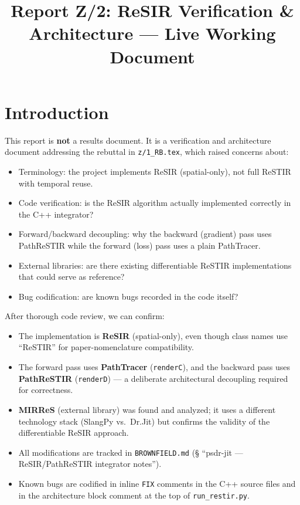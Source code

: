 
\title{Report Z/2: ReSIR Verification \& Architecture --- Live Working Document}

\maketitle

\section{Introduction}

This report is \textbf{not} a results document. It is a verification and
architecture document addressing the rebuttal in \texttt{z/1\_RB.tex}, which
raised concerns about:

\begin{itemize}
    \item Terminology: the project implements ReSIR (spatial-only), not full
        ReSTIR with temporal reuse.
    \item Code verification: is the ReSIR algorithm actually implemented
        correctly in the C++ integrator?
    \item Forward/backward decoupling: why the backward (gradient) pass uses
        PathReSTIR while the forward (loss) pass uses a plain PathTracer.
    \item External libraries: are there existing differentiable ReSTIR
        implementations that could serve as reference?
    \item Bug codification: are known bugs recorded in the code itself?
\end{itemize}

After thorough code review, we can confirm:

\begin{itemize}
    \item The implementation is \textbf{ReSIR} (spatial-only), even though
        class names use ``ReSTIR'' for paper-nomenclature compatibility.
    \item The forward pass uses \textbf{PathTracer} (\texttt{renderC}), and the
        backward pass uses \textbf{PathReSTIR} (\texttt{renderD}) --- a
        deliberate architectural decoupling required for correctness.
    \item \textbf{MIRReS} (external library) was found and analyzed; it uses a
        different technology stack (SlangPy vs.\ Dr.Jit) but confirms the
        validity of the differentiable ReSIR approach.
    \item All modifications are tracked in \texttt{BROWNFIELD.md} (\S
        ``psdr-jit --- ReSIR/PathReSTIR integrator notes'').
    \item Known bugs are codified in inline \texttt{FIX} comments in the C++
        source files and in the architecture block comment at the top of
        \texttt{run\_restir.py}.
\end{itemize}

